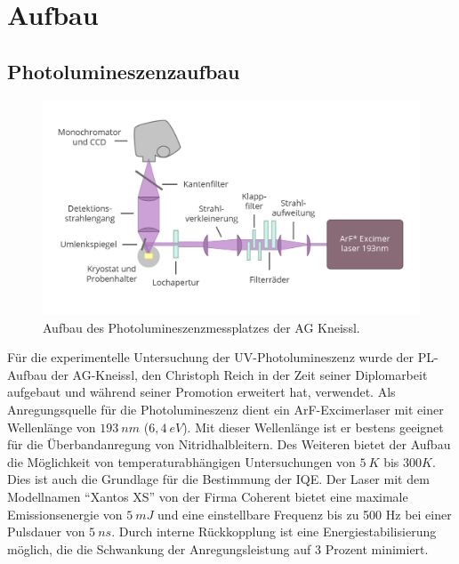 
\chapter{Aufbau}


\thispagestyle{fancy}

\section{Photolumineszenzaufbau}
\begin{figure}[!htb]
    \centering
    \begin{minipage}[t]{\linewidth}
        \centering
        \includegraphics[width=0.8\linewidth]{Bilder/aufbauPL.png}
        \caption{Aufbau des Photolumineszenzmessplatzes der AG Kneissl. }
        \label{fig:wurtz}
    \end{minipage}%
\end{figure}
\noindent
Für die experimentelle Untersuchung der UV-Photolumineszenz wurde der PL-Aufbau der AG-Kneissl, den Christoph Reich in der Zeit seiner Diplomarbeit aufgebaut und während seiner Promotion erweitert hat, verwendet\cite{creich}. 
Als Anregungsquelle für die Photolumineszenz dient ein ArF-Excimerlaser mit einer Wellenlänge von $193 \ nm$ ($6,4 \ eV$). Mit dieser Wellenlänge ist er bestens geeignet für die Überbandanregung von Nitridhalbleitern. 
Des Weiteren bietet der Aufbau die Möglichkeit von temperaturabhängigen Untersuchungen von $5 \ K $ bis $300 K$. Dies ist auch die Grundlage für die Bestimmung der IQE. 
\newline
Der Laser mit dem Modellnamen "`Xantos XS"' von der Firma Coherent bietet eine maximale Emissionsenergie von $ 5 \ mJ $ und eine einstellbare Frequenz bis zu 500 Hz bei einer Pulsdauer von $5 \ ns$.
Durch interne Rückkopplung ist eine Energiestabilisierung möglich, die die Schwankung der Anregungsleistung auf 3 Prozent minimiert. 
\newline
